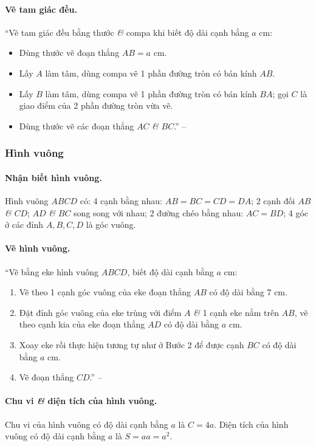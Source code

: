 \documentclass{article}
\numberwithin{equation}{section}
\begin{document}
\paragraph{Vẽ tam giác đều.} ``Vẽ tam giác đều bằng thước \textit{\&} compa khi biết độ dài cạnh bằng $a$ cm:
\begin{itemize}
	\item Dùng thước vẽ đoạn thẳng $AB = a$ cm.
	\item Lấy $A$ làm tâm, dùng compa vẽ 1 phần đường tròn có bán kính $AB$.
	\item Lấy $B$ làm tâm, dùng compa vẽ 1 phần đường tròn có bán kính $BA$; gọi $C$ là giao điểm của 2 phần đường tròn vừa vẽ.
	\item Dùng thước vẽ các đoạn thẳng $AC$ \textit{\&} $BC$.'' -- \cite[p. 94]{SGK_Toan_6_Canh_Dieu_tap_1}
\end{itemize}

\subsubsection{Hình vuông}

\paragraph{Nhận biết hình vuông.} Hình vuông $ABCD$ có: 4 cạnh bằng nhau: $AB = BC = CD = DA$; 2 cạnh đối $AB$ \textit{\&} $CD$; $AD$ \textit{\&} $BC$ song song với nhau; 2 đường chéo bằng nhau: $AC = BD$; 4 góc ở các đỉnh $A,B,C,D$ là góc vuông.

\paragraph{Vẽ hình vuông.} ``Vẽ bằng eke hình vuông $ABCD$, biết độ dài cạnh bằng $a$ cm:
\begin{enumerate}
	\item Vẽ theo 1 cạnh góc vuông của eke đoạn thẳng $AB$ có độ dài bằng 7 cm.
	\item Đặt đỉnh góc vuông của eke trùng với điểm $A$ \textit{\&} 1 cạnh eke nằm trên $AB$, vẽ theo cạnh kia của eke đoạn thẳng $AD$ có độ dài bằng $a$ cm.
	\item Xoay eke rồi thực hiện tương tự như ở Bước 2 để được cạnh $BC$ có độ dài bằng $a$ cm.
	\item Vẽ đoạn thẳng $CD$.'' -- \cite[p. 95]{SGK_Toan_6_Canh_Dieu_tap_1}
\end{enumerate}

\paragraph{Chu vi \textit{\&} diện tích của hình vuông.} Chu vi của hình vuông có độ dài cạnh bằng $a$ là $C = 4a$. Diện tích của hình vuông có độ dài cạnh bằng $a$ là $S = aa = a^2$.
\end{document}
